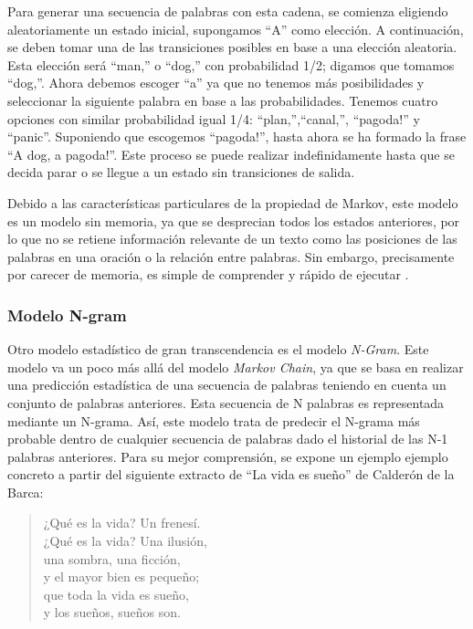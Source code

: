 Para generar una secuencia de palabras con esta cadena, se comienza eligiendo aleatoriamente un estado inicial, supongamos ``A'' como elección. A continuación, se deben tomar una de las transiciones posibles en base a una elección aleatoria. Esta elección será ``man,'' o ``dog,'' con probabilidad 1/2; digamos que tomamos ``dog,''. Ahora debemos escoger ``a'' ya que no tenemos más posibilidades y seleccionar la siguiente palabra en base a las probabilidades. Tenemos cuatro opciones con similar probabilidad igual 1/4: ``plan,'',``canal,'', ``pagoda!'' y ``panic''. Suponiendo que escogemos ``pagoda!'', hasta ahora se ha formado la frase ``A dog, a pagoda!''. Este proceso se puede realizar indefinidamente hasta que se decida parar o se llegue a un estado sin transiciones de salida.




Debido a las características particulares de la propiedad de Markov, este modelo es un modelo sin memoria, ya que se desprecian todos los estados anteriores, por lo que no se retiene información relevante de un texto como las posiciones de las palabras en una oración o la relación entre palabras. Sin embargo, precisamente por carecer de memoria, es simple de comprender y rápido de ejecutar \citep{fumagalli_2020}.




\subsubsection{Modelo N-gram}

Otro modelo estadístico de gran transcendencia es el modelo \textit{N-Gram}. Este modelo va un poco más allá del modelo \textit{Markov Chain}, ya que se basa en realizar una predicción estadística de una secuencia de palabras teniendo en cuenta un conjunto de palabras anteriores. Esta secuencia de N palabras es representada mediante un N-grama.
Así, este modelo trata de predecir el N-grama más probable dentro de cualquier secuencia de palabras dado el historial de las N-1 palabras anteriores. Para su mejor comprensión, se expone un ejemplo ejemplo concreto a partir del siguiente extracto de ``La vida es sueño'' de Calderón de la Barca:


\begin{verse}
	¿Qué es la vida? Un frenesí.\\
	¿Qué es la vida? Una ilusión,\\
	una sombra, una ficción,\\
	y el mayor bien es pequeño;\\
	que toda la vida es sueño,\\
	y los sueños, sueños son.\\
\end{verse}

